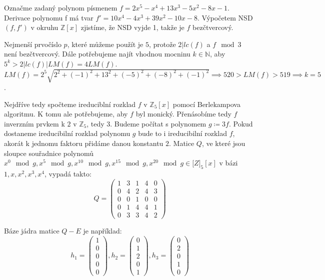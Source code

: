 \documentclass[11pt, a4paper]{article}
\begin{document}
Označme zadaný polynom písmenem $f = 2 x^5 - x^4 + 13 x^3 - 5 x^2 - 8 x - 1$. Derivace polynomu f má tvar $f' = 10x^4-4x^3+39x^2-10x-8$. Výpočetem NSD$(f,f')$ v okruhu $\mathbb{Z}[x]$ zjistíme, že NSD vyjde 1, takže je $f$ bezčtvercový.

Nejmenší prvočíslo $p$, které můžeme použít je $5$, protože $2 | lc(f)$ a $f \mod 3$ není bezčtvercový. Dále potřebujeme najít vhodnou mocninu $k \in \mathbb{N}$, aby $5^k > 2|lc(f)|LM(f) = 4LM(f)$. $LM(f) = 2^5 \sqrt{2^2+(-1)^2+13^2+(-5)^2+(-8)^2+(-1)^2} \implies 520 > LM(f) > 519 \implies k=5$. 

Nejdříve tedy spočteme ireduciblní rozklad $f$ v $\mathbb{Z}_5[x]$ pomocí Berlekampova algoritmu. K tomu ale potřebujeme, aby $f$ byl monický. Přenásobíme tedy $f$ inverzním prvkem k $2$ v $\mathbb{Z}_5$, tedy $3$. Budeme počítat s polynomem $g \coloneqq 3f$. Pokud dostaneme ireducibilní rozklad polynomu $g$ bude to i ireducibilní rozklad $f$, akorát k jednomu faktoru přidáme danou konstantu $2$. Matice $Q$, ve které jsou sloupce souřadnice polynomů $x^0 \mod g, x^5 \mod g, x^{10} \mod g, x^{15} \mod g, x^{20} \mod g \in \mathbb[Z]_5[x]$ v bázi $1,x,x^2,x^3,x^4$, vypadá takto:
\[
Q = \begin{pmatrix}
1 & 3 & 1 & 4 & 0 \\
0 & 4 & 2 & 4 & 3 \\
0 & 0 & 1 & 0 & 0 \\
0 & 1 & 4 & 4 & 1 \\
0 & 3 & 3 & 4 & 2
\end{pmatrix}
\]

Báze jádra matice $Q-E$ je například:
\[
h_1 = \begin{pmatrix}
1 \\
0 \\
0 \\
0 \\
0 
\end{pmatrix},
h_2 = \begin{pmatrix}
0 \\
1 \\
2 \\
0 \\
1 
\end{pmatrix}, 
h_3 = \begin{pmatrix}
0 \\
2 \\
0 \\
1 \\
0 
\end{pmatrix}
\]
\end{document}
